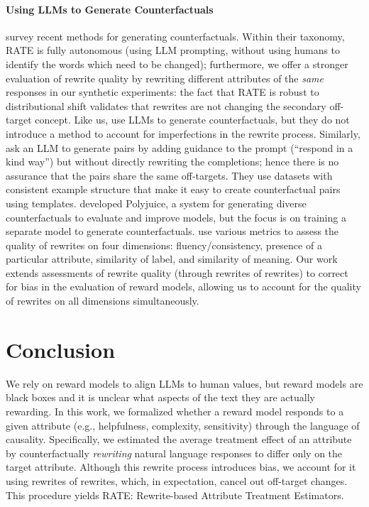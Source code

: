 \documentclass{article}
\begin{document}
\paragraph{Using LLMs to Generate Counterfactuals} \citet{wang2024surveynaturallanguagecounterfactual} survey recent methods for generating counterfactuals. 
Within their taxonomy, RATE is fully autonomous (using LLM prompting, without using humans to identify the words which need to be changed); furthermore, we offer a stronger evaluation of rewrite quality by rewriting different attributes of the \emph{same} responses in our synthetic experiments: the fact that RATE is robust to distributional shift validates that rewrites are not changing the secondary off-target concept. 
Like us, \cite{gat2023faithfulexplanationsblackboxnlp} use LLMs to generate counterfactuals, but they do not introduce a method to account for imperfections in the rewrite process. 
Similarly, \citet{butcher2024aligninglargelanguagemodels} ask an LLM to generate pairs by adding guidance to the prompt (``respond in a kind way'') but without directly rewriting the completions; hence there is no assurance that the pairs share the same off-targets. 
They use datasets with consistent example structure that make it easy to create counterfactual pairs using templates. 
\citet{wu2021polyjuicegeneratingcounterfactualsexplaining} developed Polyjuice, a system for generating diverse counterfactuals to evaluate and improve models, but the focus is on training a separate model to generate counterfactuals. 
\citet{fryer2022flexibletextgenerationcounterfactual} use various metrics to assess the quality of rewrites on four dimensions: fluency/consistency, presence of a particular attribute, similarity of label, and similarity of meaning. Our work extends assessments of rewrite quality (through rewrites of rewrites) to correct for bias in the evaluation of reward models, allowing us to account for the quality of rewrites on all dimensions simultaneously.

\section{Conclusion}
We rely on reward models to align LLMs to human values, but reward models are black boxes and it is unclear what aspects of the text they are actually rewarding. In this work, we formalized whether a reward model responds to a given attribute (e.g., helpfulness, complexity, sensitivity) through the language of causality. Specifically, we estimated the average treatment effect of an attribute by counterfactually \emph{rewriting} natural language responses to differ only on the target attribute. Although this rewrite process introduces bias, we account for it using rewrites of rewrites, which, in expectation, cancel out off-target changes. This procedure yields RATE: Rewrite-based Attribute
Treatment Estimators. 
\end{document}
